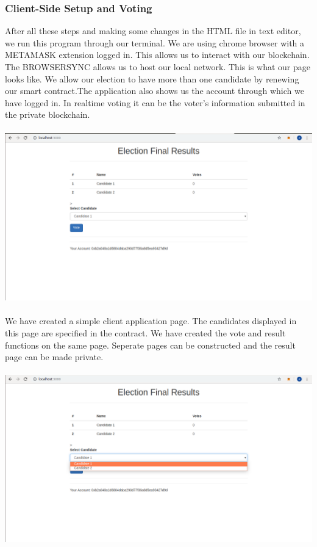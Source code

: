 \documentclass{article}
\begin{document}
\subsubsection{Client-Side Setup and Voting}
 After all these steps and making some changes in the HTML file in text editor, we run this program through our terminal. We are using chrome browser with a METAMASK extension logged in. This allows us to interact with our blockchain. The BROWSERSYNC allows us to host our local network. This is what our page looks like. We allow our election to have more than one candidate by renewing our smart contract.The application also shows us the account through which we have logged in. In realtime voting it can be the voter's information submitted in the private blockchain.
 \\
 \\
 \includegraphics[scale=0.45]{chrome1.png}
 \\
 \\
 We have created a simple client application page. The candidates displayed in this page are specified in the contract. We have created the vote and result functions on the same page. Seperate pages can be constructed and the result page can be made private.
 \\
 \\
 \includegraphics[scale=0.45]{chrome2.png}
\end{document}
